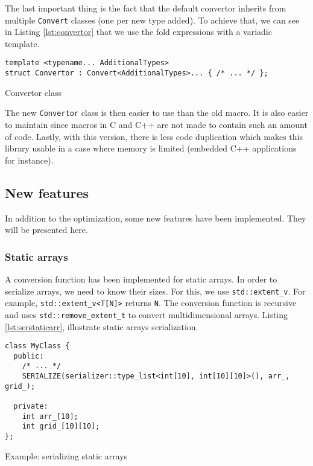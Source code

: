The last important thing is the fact that the default convertor inherits from
multiple \texttt{Convert} classes (one per new type added). To achieve that, we
can see in Listing \ref{lst:convertor} that we use the fold expressions with
a variadic template.

\begin{listing}[ht!]
\begin{verbatim}
template <typename... AdditionalTypes>
struct Convertor : Convert<AdditionalTypes>... { /* ... */ };
\end{verbatim}
\caption{Convertor class}
\label{lst:convertor}
\end{listing}

The new \texttt{Convertor} class is then easier to use than the old macro. It
is also easier to maintain since macros in C and C++ are not made to contain
such an amount of code. Lastly, with this version, there is less code
duplication which makes this library usable in a case where memory is limited
(embedded C++ applications for instance).

\subsection{New features}

In addition to the optimization, some new features have been implemented. They
will be presented here.

\subsubsection{Static arrays}

A conversion function has been implemented for static arrays. In order to
serialize arrays, we need to know their sizes. For this, we use
\texttt{std::extent\_v}. For example, \texttt{std::extent\_v<T[N]>} returns
\texttt{N}. The conversion function is recursive and uses
\texttt{std::remove\_extent\_t} to convert multidimensional arrays. Listing
\ref{lst:serstaticarr}, illustrate static arrays serialization.

\begin{listing}[ht!]
\begin{verbatim}
class MyClass {
  public:
    /* ... */
    SERIALIZE(serializer::type_list<int[10], int[10][10]>(), arr_, grid_);

  private:
    int arr_[10];
    int grid_[10][10];
};
\end{verbatim}
\caption{Example: serializing static arrays}
\label{lst:serstaticarr}
\end{listing}

